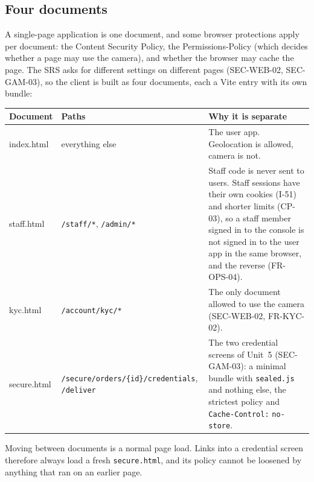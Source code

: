 \documentclass[11pt,a4paper]{article}
\newenvironment{dtable}[1]{\small\begin{longtable}{#1}}{\end{longtable}}
\begin{document}
\subsection{Four documents}
A single-page application is one document, and some browser protections apply per document: the Content Security Policy, the Permissions-Policy (which decides whether a page may use the camera), and whether the browser may cache the page. The SRS asks for different settings on different pages (SEC-WEB-02, SEC-GAM-03), so the client is built as four documents, each a Vite entry with its own bundle:
\begin{dtable}{@{}>{\ttfamily\raggedright\arraybackslash}p{2.1cm}>{\raggedright\arraybackslash}p{3.6cm}>{\raggedright\arraybackslash}p{9.5cm}@{}}
\toprule
\textnormal{\textbf{Document}} & \textbf{Paths} & \textbf{Why it is separate} \\ \midrule \endhead
index.html & everything else & The user app. Geolocation is allowed, camera is not. \\
staff.html & \texttt{/staff/*}, \texttt{/admin/*} & Staff code is never sent to users. Staff sessions have their own cookies (I-51) and shorter limits (CP-03), so a staff member signed in to the console is not signed in to the user app in the same browser, and the reverse (FR-OPS-04). \\
kyc.html & \texttt{/account/kyc/*} & The only document allowed to use the camera (SEC-WEB-02, FR-KYC-02). \\
secure.html & \texttt{/secure/orders/\{id\}/\allowbreak credentials}, \texttt{/deliver} & The two credential screens of Unit~5 (SEC-GAM-03): a minimal bundle with \texttt{sealed.js} and nothing else, the strictest policy and \texttt{Cache-Control:} \texttt{no-store}. \\
\bottomrule
\end{dtable}
Moving between documents is a normal page load. Links into a credential screen therefore always load a fresh \texttt{secure.html}, and its policy cannot be loosened by anything that ran on an earlier page.
\end{document}
